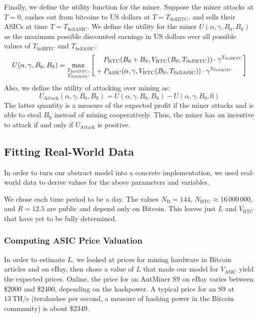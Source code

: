\documentclass[12pt]{article}
\newcommand*{\Time}{T}
\newcommand*{\ABtcOrig}{{B_0}}
\newcommand*{\ABtcStolen}{{B_{\mathrm{S}}}}
\newcommand*{\NumBtc}{{N_{\mathrm{BTC}}}}
\newcommand*{\ExchgRate}{{V_{\mathrm{BTC}}}}
\newcommand*{\AsicValue}{{V_{\mathrm{ASIC}}}}
\newcommand*{\TimeCashOut}{{T_{\mathrm{SellBTC}}}}
\newcommand*{\TimeSellAsics}{{T_{\mathrm{SellASIC}}}}
\newcommand*{\Utility}{U}
\newcommand*{\AttackUtility}{{U_{\mathrm{Attack}}}}
\newcommand*{\PayoffBtc}{{P_{\mathrm{BTC}}}}
\newcommand*{\PayoffAsic}{{P_{\mathrm{ASIC}}}}
\newcommand*{\BlocksPerPeriod}{{N_{\mathrm{B}}}}
\newcommand*{\THs}{\ \mathrm{TH/s}}
\begin{document}
Finally, we define the utility function for the miner.
Suppose the miner attacks at $\Time = 0$, cashes out from bitcoins to US dollars at
$\Time = \TimeCashOut$, and sells their ASICs at time $\Time = \TimeSellAsics$.
We define the utility for the miner $\Utility(\alpha, \gamma, \ABtcOrig, \ABtcStolen)$ as the maximum possible discounted earnings in US dollars over all possible values of $\TimeCashOut$ and $\TimeSellAsics$:
\[
  \Utility(\alpha, \gamma, \ABtcOrig, \ABtcStolen) =
  \max_{\substack{\TimeCashOut,\\\TimeSellAsics}}
    \left[
      \begin{aligned}
        & \hphantom{{}+{}}
        \PayoffBtc(\ABtcOrig + \ABtcStolen, \ExchgRate(\ABtcStolen, \TimeCashOut))
          \cdot \gamma^\TimeCashOut \\
        & {}+ \PayoffAsic(\alpha, \gamma, \ExchgRate(\ABtcStolen, \TimeSellAsics))
          \cdot \gamma^\TimeSellAsics
       \end{aligned}
    \right]
\]
Also, we define the utility of attacking over mining as:
\[
  \AttackUtility(\alpha, \gamma, \ABtcOrig, \ABtcStolen) = \Utility(\alpha, \gamma, \ABtcOrig, \ABtcStolen) - \Utility(\alpha, \gamma, \ABtcOrig, 0)
\]
The latter quantity is a measure of the expected profit if the miner attacks and is able to steal $\ABtcStolen$ instead of mining cooperatively.
Thus, the miner has an incentive to attack if and only if $\AttackUtility$ is positive.

\subsection{Fitting Real-World Data}

In order to turn our abstract model into a concrete implementation, we used real-world data to derive values for the above parameters and variables.

We chose each time period to be a day. The values $\BlocksPerPeriod = 144$, $\NumBtc \approx 16\,000\,000$, and $R = 12.5$ are public and depend only on Bitcoin.
This leaves just $L$ and $\ExchgRate$ that have yet to be fully determined.

\subsubsection{Computing ASIC Price Valuation}

In order to estimate $L$, we looked at prices for mining hardware in Bitcoin articles and on eBay, then chose a value of $L$ that made our model for $\AsicValue$ yield the expected prices.
Online, the price for an AntMiner S9 on eBay varies between \$2000 and \$2400, depending on the hashpower.
A typical price for an S9 at $13 \THs$ (terahashes per second, a measure of hashing power in the Bitcoin community) is about \$2349.\cite{ebays9}
\end{document}
